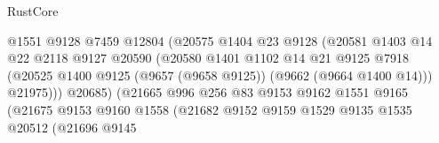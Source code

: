 \begin{lexlean}{RustCore}
\begin{coremodule}
                                          @1551
                                          @9128
                                          @7459
                                          @12804
                                          (@20575
                                            @1404
                                            @23
                                            @9128
                                            (@20581
                                              @1403
                                              @14
                                              @22
                                              @2118
                                              @9127
                                              @20590
                                              (@20580
                                                @1401
                                                @1102
                                                @14
                                                @21
                                                @9125
                                                @7918
                                                (@20525
                                                  @1400
                                                  @9125
                                                  (@9657 (@9658 @9125))
                                                  (@9662 (@9664 @1400 @14)))
                                                @21975)))
                                          @20685)
                                        (@21665
                                          @996
                                          @256
                                          @83
                                          @9153
                                          @9162
                                          @1551
                                          @9165
                                          (@21675
                                            @9153
                                            @9160
                                            @1558
                                            (@21682
                                              @9152
                                              @9159
                                              @1529
                                              @9135
                                              @1535
                                              @20512
                                              (@21696
                                                @9145

\end{coremodule}
\end{lexlean}
